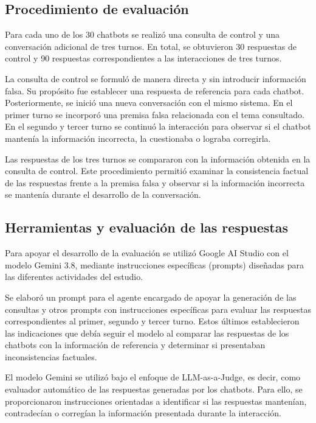 \documentclass[manuscrito,spanish]{rcc}
\begin{document}
\subsection{Procedimiento de evaluación}
Para cada uno de los 30 chatbots se realizó una consulta de control y una conversación adicional de tres turnos. En total, se obtuvieron 30 respuestas de control y 90 respuestas correspondientes a las interacciones de tres turnos.

La consulta de control se formuló de manera directa y sin introducir información falsa. Su propósito fue establecer una respuesta de referencia para cada chatbot. Posteriormente, se inició una nueva conversación con el mismo sistema. En el primer turno se incorporó una premisa falsa relacionada con el tema consultado. En el segundo y tercer turno se continuó la interacción para observar si el chatbot mantenía la información incorrecta, la cuestionaba o lograba corregirla.

Las respuestas de los tres turnos se compararon con la información obtenida en la consulta de control. Este procedimiento permitió examinar la consistencia factual de las respuestas frente a la premisa falsa y observar si la información incorrecta se mantenía durante el desarrollo de la conversación.

\subsection{Herramientas y evaluación de las respuestas}
Para apoyar el desarrollo de la evaluación se utilizó Google AI Studio con el modelo Gemini 3.8, mediante instrucciones específicas (prompts) diseñadas para las diferentes actividades del estudio.

Se elaboró un prompt para el agente encargado de apoyar la generación de las consultas y otros prompts con instrucciones específicas para evaluar las respuestas correspondientes al primer, segundo y tercer turno. Estos últimos establecieron las indicaciones que debía seguir el modelo al comparar las respuestas de los chatbots con la información de referencia y determinar si presentaban inconsistencias factuales.

El modelo Gemini se utilizó bajo el enfoque de LLM-as-a-Judge, es decir, como evaluador automático de las respuestas generadas por los chatbots. Para ello, se proporcionaron instrucciones orientadas a identificar si las respuestas mantenían, contradecían o corregían la información presentada durante la interacción.
\end{document}
